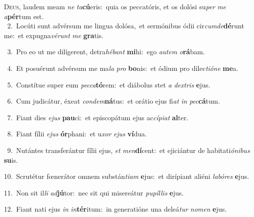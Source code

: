 \lettrine{\initial\textcolor{\initialcolor}{D}}{eus,} laudem meam \textit{ne} \textit{ta}\-\textbf{cú}eris:~\star quia os peccatóris, et os dolósi su\textit{per} \textit{me} \textit{a}\-\textbf{pér}tum est.\\
{\numbfont\textcolor{\numbcolor}{~2.}}~Locúti sunt advérsum me lingua dolósa,~\dagger et sermónibus ódii cir\-\textit{cum}\-\textit{de}\textbf{dé}runt me:~\star et expugna\-\textit{vé}\-\textit{runt} \textit{me} \textbf{gra}\-tis.\par
{\numbfont\textcolor{\numbcolor}{~3.}}~Pro eo ut me dilígerent, detra\-\textit{hé}\-\textit{bant} \textbf{mi}\-hi:~\star ego \textit{au}\-\textit{tem} \textit{o}\-\textbf{rá}bam.\par
{\numbfont\textcolor{\numbcolor}{~4.}}~Et posuérunt advérsum me ma\textit{la} \textit{pro} \textbf{bo}\-nis:~\star et ódium pro dilec\-\textit{ti}\-\textit{ó}\textit{ne} \textbf{me}\-a.\par
{\numbfont\textcolor{\numbcolor}{~5.}}~Constítue super eum \textit{pec}\-\textit{ca}\textbf{tó}rem:~\star et diábolus stet \textit{a} \textit{dex}\-\textit{tris} \textbf{e}\-jus.\par
{\numbfont\textcolor{\numbcolor}{~6.}}~Cum judicátur, éxeat \textit{con}\-\textit{dem}\textbf{ná}tus:~\star et orátio ejus fi\textit{at} \textit{in} \textit{pec}\-\textbf{cá}tum.\par
{\numbfont\textcolor{\numbcolor}{~7.}}~Fiant dies \textit{e}\-\textit{jus} \textbf{pau}\-ci:~\star et episcopátum ejus ac\-\textit{cí}\-\textit{pi}\textit{at} \textbf{al}\-ter.\par
{\numbfont\textcolor{\numbcolor}{~8.}}~Fiant fílii \textit{e}\-\textit{jus} \textbf{ór}\-phani:~\star et u\textit{xor} \textit{e}\-\textit{jus} \textbf{ví}\-dua.\par
{\numbfont\textcolor{\numbcolor}{~9.}}~Nutántes transferántur fílii ejus, \textit{et} \textit{men}\-\textbf{dí}cent:~\star et ejiciántur de habitati\-\textit{ó}\-\textit{ni}\textit{bus} \textbf{su}\-is.\par
{\numbfont\textcolor{\numbcolor}{10.}}~Scrutétur fœnerátor omnem substán\-\textit{ti}\-\textit{am} \textbf{e}\-jus:~\star et dirípiant aliéni \textit{la}\-\textit{bó}\textit{res} \textbf{e}\-jus.\par
{\numbfont\textcolor{\numbcolor}{11.}}~Non sit il\textit{li} \textit{ad}\-\textbf{jú}tor:~\star nec sit qui misereátur \textit{pu}\-\textit{píl}\textit{lis} \textbf{e}\-jus.\par
{\numbfont\textcolor{\numbcolor}{12.}}~Fiant nati ejus \textit{in} \textit{in}\-\textbf{tér}itum:~\star in generatióne una deleá\textit{tur} \textit{no}\-\textit{men} \textbf{e}\-jus.\par
